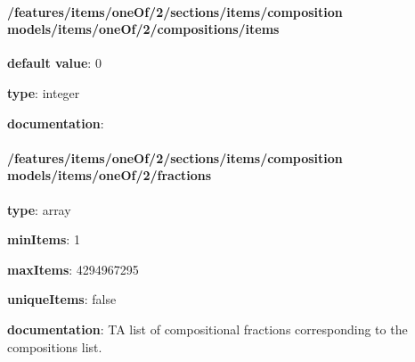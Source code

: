 \begin{itemized}
\paragraph{/features/items/oneOf/2/sections/items/composition models/items/oneOf/2/compositions/items} \begin{itemized}
\item {\bf default value}: 0
\item {\bf type}: integer
\item {\bf documentation}: 
\end{itemized}\end{itemized}\paragraph{/features/items/oneOf/2/sections/items/composition models/items/oneOf/2/fractions} \begin{itemized}
\item {\bf type}: array
\item {\bf minItems}: 1
\item {\bf maxItems}: 4294967295
\item {\bf uniqueItems}: false
\item {\bf documentation}: TA list of compositional fractions corresponding to the compositions list.

\end{itemized}
